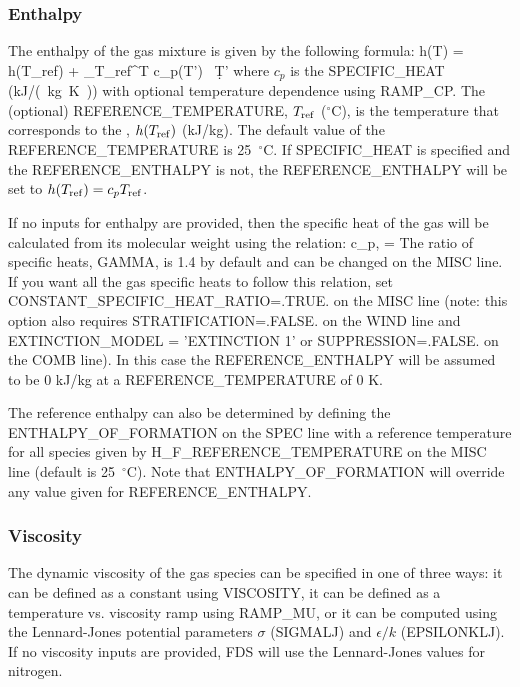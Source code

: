\documentclass[11pt]{book}
\begin{document}
\subsubsection{Enthalpy}
\label{info:Enthalpy}

The enthalpy of the gas mixture is given by the following formula:
\be
   h(T) = h(T_{\rm ref}) + \int_{T_{\rm ref}}^T c_p(T') \, \d T'
\ee
where $c_p$ is the {\ct SPECIFIC\_HEAT} (\si{kJ/(kg.K)}) with optional temperature dependence using {\ct RAMP\_CP}.  The (optional) {\ct REFERENCE\_TEMPERATURE}, $T_{\rm ref}$ ($^\circ$C), is the temperature that corresponds to the , $h(T_{\rm ref})$ (kJ/kg).  The default value of the  {\ct REFERENCE\_TEMPERATURE} is 25~$^\circ$C.  If {\ct SPECIFIC\_HEAT} is specified and the {\ct REFERENCE\_ENTHALPY} is not, the {\ct REFERENCE\_ENTHALPY} will be set to $h(T_{\rm ref})=c_p T_{\rm ref}$.

If no inputs for enthalpy are provided, then the specific heat of the gas will be calculated from its molecular weight using the relation:
\be
   c_{p,\alpha} =  
\ee
The ratio of specific heats, {\ct GAMMA}, is 1.4 by default and can be changed on the {\ct MISC} line. If you want all the gas specific heats to follow this relation, set {\ct CONSTANT\_SPECIFIC\_HEAT\_RATIO=.TRUE.} on the {\ct MISC} line (note: this option also requires {\ct STRATIFICATION=.FALSE.} on the {\ct WIND} line and {\ct EXTINCTION\_MODEL = 'EXTINCTION 1'} or {\ct SUPPRESSION=.FALSE.} on the {\ct COMB} line).  In this case the {\ct REFERENCE\_ENTHALPY} will be assumed to be 0 kJ/kg at a {\ct REFERENCE\_TEMPERATURE} of 0 K.

The reference enthalpy can also be determined by defining the {\ct ENTHALPY\_OF\_FORMATION} on the {\ct SPEC} line with a reference temperature for all species given by {\ct H\_F\_REFERENCE\_TEMPERATURE} on the {\ct MISC} line (default is 25~$^\circ$C). Note that {\ct ENTHALPY\_OF\_FORMATION} will override any value given for {\ct REFERENCE\_ENTHALPY}.

\subsubsection{Viscosity}

The dynamic viscosity of the gas species can be specified in one of three ways:  it can be defined as a constant using {\ct VISCOSITY}, it can be defined as a temperature vs. viscosity ramp  using {\ct RAMP\_MU}, or it can be computed  using the Lennard-Jones potential parameters $\sigma$ ({\ct SIGMALJ}) and $\epsilon/k$ ({\ct EPSILONKLJ}).  If no viscosity inputs are provided, FDS will use the Lennard-Jones values for nitrogen.
\end{document}
